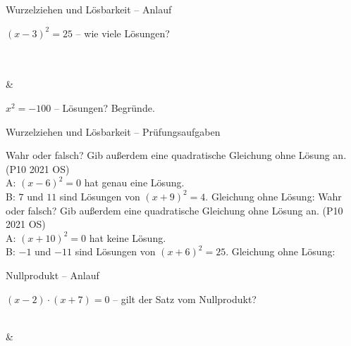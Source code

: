 \setcounter{aufgabe}{18}

\begin{aufgabe}{Wurzelziehen und Lösbarkeit – Anlauf}
\begin{teile}
\teil $(x - 3)^2 = 25$ – wie viele Lösungen?\\  \\  \\ 
\end{teile}
\begin{gleichungsraster}[2]
 &
\end{gleichungsraster}
\begin{teile}
\teil $x^2 = -100$ – Lösungen? Begründe.
\end{teile}
\end{aufgabe}

\begin{aufgabe}{Wurzelziehen und Lösbarkeit – Prüfungsaufgaben}
\begin{teile}
\steil Wahr oder falsch? Gib außerdem eine quadratische Gleichung ohne Lösung an. \hfill (P10 2021 OS)\\ A: $(x - 6)^2 = 0$ hat genau eine Lösung.  \\ B: $7$ und $11$ sind Lösungen von $(x + 9)^2 = 4$.   Gleichung ohne Lösung: \leerfeld
\steil Wahr oder falsch? Gib außerdem eine quadratische Gleichung ohne Lösung an. \hfill (P10 2021 OS)\\ A: $(x + 10)^2 = 0$ hat keine Lösung.  \\ B: $-1$ und $-11$ sind Lösungen von $(x + 6)^2 = 25$.   Gleichung ohne Lösung: \leerfeld
\end{teile}
\end{aufgabe}

\begin{aufgabe}{Nullprodukt – Anlauf}
\begin{teile}
\teil $(x - 2) \cdot (x + 7) = 0$ – gilt der Satz vom Nullprodukt?\\  \\ 
\end{teile}
\begin{gleichungsraster}[2]
 &
 \\
\end{gleichungsraster}
\end{aufgabe}

